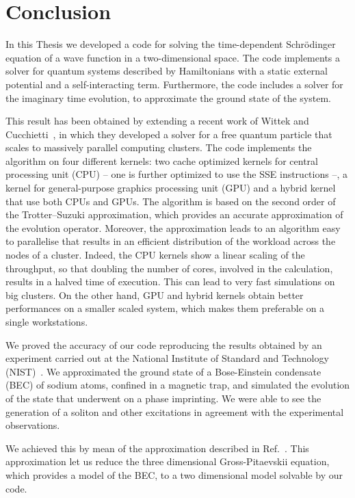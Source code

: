 \chapter{Conclusion}
In this Thesis we developed a code for solving the time-dependent Schr\"odinger equation of a wave function in a two-dimensional space. The code implements a solver for quantum systems described by Hamiltonians with a static external potential and a self-interacting term. Furthermore, the code includes a solver for the imaginary time evolution, to approximate the ground state of the system.

This result has been obtained by extending  a recent work of Wittek and Cucchietti~\citep{Wittek20131165}, in which they developed a solver for a free quantum particle that scales to massively parallel computing clusters. The code implements the algorithm on four different kernels: two cache optimized kernels for central processing unit (CPU) -- one is further optimized to use the SSE instructions --, a kernel for general-purpose graphics processing unit (GPU) and a hybrid kernel that use both CPUs and GPUs. The algorithm is based on the second order of the Trotter--Suzuki approximation, which provides an accurate approximation of the evolution operator. Moreover, the approximation leads to an algorithm easy to parallelise that results in an efficient distribution of the workload across the nodes of a cluster. Indeed, the CPU kernels show a linear scaling of the throughput, so that doubling the number of cores, involved in the calculation, results in a halved time of execution. This can lead to very fast simulations on big clusters. On the other hand, GPU and hybrid kernels obtain better performances on a smaller scaled system, which makes them preferable on a single workstations.

We proved the accuracy of our code reproducing the results obtained by an experiment carried out at the National Institute of Standard and Technology (NIST)~\citep{DSF00}. We approximated the ground state of a Bose-Einstein condensate (BEC) of sodium atoms, confined in a magnetic trap, and simulated the evolution of the state that underwent on a phase imprinting. We were able to see the generation of a soliton and other excitations in agreement with the experimental observations.

We achieved this by mean of the approximation described in Ref.~\citep{PietroMassignan}. This approximation let us reduce the three dimensional Gross-Pitaevskii equation, which provides a model of the BEC, to a two dimensional model solvable by our code.

